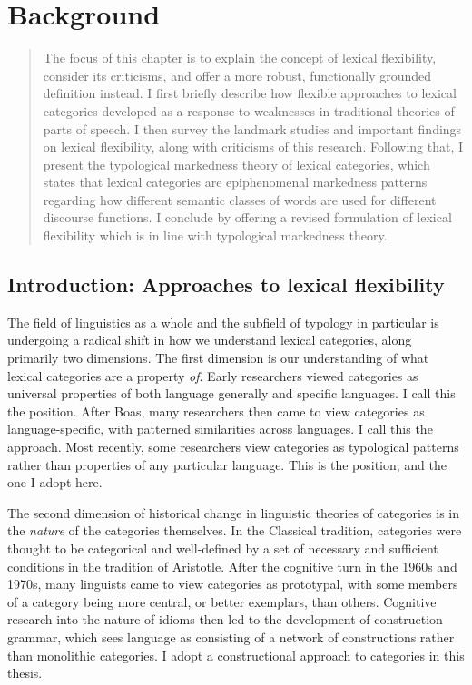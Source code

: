 \chapter{Background}
\label{ch:background}

\blockquote{The focus of this chapter is to explain the concept of lexical flexibility, consider its criticisms, and offer a more robust, functionally grounded definition instead. I first briefly describe how flexible approaches to lexical categories developed as a response to weaknesses in traditional theories of parts of speech. I then survey the landmark studies and important findings on lexical flexibility, along with criticisms of this research. Following that, I present the typological markedness theory of lexical categories, which states that lexical categories are epiphenomenal markedness patterns regarding how different semantic classes of words are used for different discourse functions. I conclude by offering a revised formulation of lexical flexibility which is in line with typological markedness theory.}

\section{Introduction: Approaches to lexical flexibility}
\label{sec:2.1}

The field of linguistics as a whole and the subfield of typology in particular is undergoing a radical shift in how we understand lexical categories, along primarily two dimensions. The first dimension is our understanding of what lexical categories are a property \emph{of}. Early researchers viewed categories as universal properties of both language generally and specific languages. I call this the  position. After Boas, many researchers then came to view categories as language-specific, with patterned similarities across languages. I call this the  approach. Most recently, some researchers view categories as typological patterns rather than properties of any particular language. This is the  position, and the one I adopt here.

The second dimension of historical change in linguistic theories of categories is in the \emph{nature} of the categories themselves. In the Classical tradition, categories were thought to be categorical and well-defined by a set of necessary and sufficient conditions in the tradition of Aristotle. After the cognitive turn in the 1960s and 1970s, many linguists came to view categories as prototypal, with some members of a category being more central, or better exemplars, than others. Cognitive research into the nature of idioms then led to the development of construction grammar, which sees language as consisting of a network of constructions rather than monolithic categories. I adopt a constructional approach to categories in this thesis.

